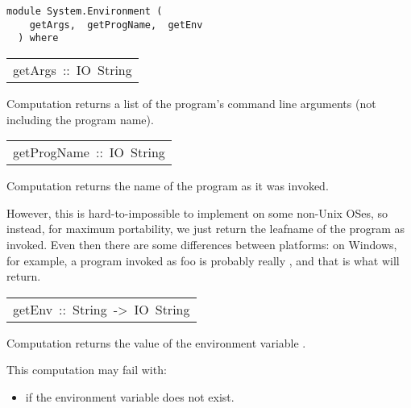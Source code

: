 \label{module:System.Environment}
\haddockbeginheader
{\haddockverb\begin{verbatim}
module System.Environment (
    getArgs,  getProgName,  getEnv
  ) where\end{verbatim}}
\haddockendheader

\begin{haddockdesc}
\item[\begin{tabular}{@{}l}
getArgs\ ::\ IO\ {\char 91}String{\char 93}
\end{tabular}]\haddockbegindoc
Computation  returns a list of the program's command
 line arguments (not including the program name).
\par

\end{haddockdesc}
\begin{haddockdesc}
\item[\begin{tabular}{@{}l}
getProgName\ ::\ IO\ String
\end{tabular}]\haddockbegindoc
Computation  returns the name of the program as it was
invoked.
\par
However, this is hard-to-impossible to implement on some non-Unix
OSes, so instead, for maximum portability, we just return the leafname
of the program as invoked. Even then there are some differences
between platforms: on Windows, for example, a program invoked as foo
is probably really , and that is what  will return.
\par

\end{haddockdesc}
\begin{haddockdesc}
\item[\begin{tabular}{@{}l}
getEnv\ ::\ String\ ->\ IO\ String
\end{tabular}]\haddockbegindoc
Computation   returns the value
 of the environment variable .  
\par
This computation may fail with:
\par
\begin{itemize}
\item
  if the environment variable
    does not exist.
\par

\end{itemize}

\end{haddockdesc}
